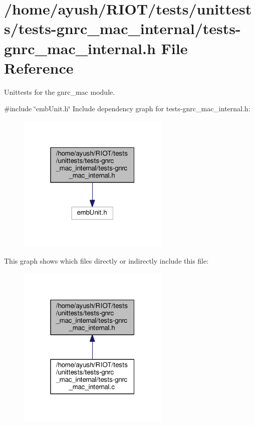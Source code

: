 \hypertarget{tests-gnrc__mac__internal_8h}{}\section{/home/ayush/\+R\+I\+O\+T/tests/unittests/tests-\/gnrc\+\_\+mac\+\_\+internal/tests-\/gnrc\+\_\+mac\+\_\+internal.h File Reference}
\label{tests-gnrc__mac__internal_8h}


Unittests for the {\ttfamily gnrc\+\_\+mac} module.  


{\ttfamily \#include \char`\"{}emb\+Unit.\+h\char`\"{}}\newline
Include dependency graph for tests-\/gnrc\+\_\+mac\+\_\+internal.h\+:
\nopagebreak
\begin{figure}[H]
\begin{center}
\leavevmode
\includegraphics[width=205pt]{tests-gnrc__mac__internal_8h__incl}
\end{center}
\end{figure}
This graph shows which files directly or indirectly include this file\+:
\nopagebreak
\begin{figure}[H]
\begin{center}
\leavevmode
\includegraphics[width=205pt]{tests-gnrc__mac__internal_8h__dep__incl}
\end{center}
\end{figure}
